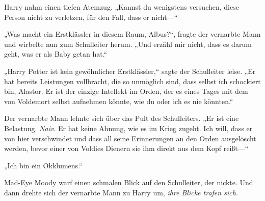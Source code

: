 Harry nahm einen tiefen Atemzug. „Kannst du wenigstens versuchen, diese Person nicht zu verletzen, für den Fall, dass er nicht—“

„Was macht ein Erstklässler in diesem Raum, Albus?“, fragte der vernarbte Mann und wirbelte nun zum Schulleiter herum. „Und erzähl mir nicht, dass es darum geht, was er als Baby getan hat.“

„Harry Potter ist kein gewöhnlicher Erstklässler,“ sagte der Schulleiter leise. „Er hat bereits Leistungen vollbracht, die so unmöglich sind, dass selbst ich schockiert bin, Alastor. Er ist der einzige Intellekt im Orden, der es eines Tages mit dem von Voldemort selbst aufnehmen könnte, wie du oder ich es nie könnten.“

Der vernarbte Mann lehnte sich über das Pult des Schulleiters. „Er ist eine Belastung. \emph{Naiv}. Er hat keine Ahnung, wie es im Krieg zugeht. Ich will, dass er von hier verschwindet und dass all seine Erinnerungen an den Orden ausgelöscht werden, bevor einer von Voldies Dienern sie ihm direkt aus dem Kopf reißt—“

„Ich bin ein Okklumens.“


Mad-Eye Moody warf einen schmalen Blick auf den Schulleiter, der nickte. Und dann drehte sich der vernarbte Mann zu Harry um, \emph{ihre Blicke trafen sich.}

